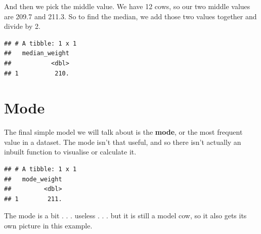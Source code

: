 \documentclass[
]{book}
\newenvironment{Shaded}{\begin{snugshade}}{\end{snugshade}}
\newcommand{\ControlFlowTok}[1]{\textcolor[rgb]{0.13,0.29,0.53}{\textbf{#1}}}
\newcommand{\DataTypeTok}[1]{\textcolor[rgb]{0.13,0.29,0.53}{#1}}
\newcommand{\KeywordTok}[1]{\textcolor[rgb]{0.13,0.29,0.53}{\textbf{#1}}}
\newcommand{\NormalTok}[1]{#1}
\newcommand{\OperatorTok}[1]{\textcolor[rgb]{0.81,0.36,0.00}{\textbf{#1}}}
\newcommand{\StringTok}[1]{\textcolor[rgb]{0.31,0.60,0.02}{#1}}
\begin{document}
And then we pick the middle value. We have 12 cows, so our two middle values are 209.7 and 211.3. So to find the median, we add those two values together and divide by 2.

\begin{Shaded}
\end{Shaded}

\begin{verbatim}
## # A tibble: 1 x 1
##   median_weight
##           <dbl>
## 1          210.
\end{verbatim}

\hypertarget{stats_mode}{%
\section{Mode}\label{stats_mode}}

The final simple model we will talk about is the \textbf{mode}, or the most frequent value in a dataset. The mode isn't that useful, and so there isn't actually an inbuilt function to visualise or calculate it.

\begin{Shaded}
\end{Shaded}

\begin{verbatim}
## # A tibble: 1 x 1
##   mode_weight
##         <dbl>
## 1        211.
\end{verbatim}

The mode is a bit . . . useless . . . but it is still a model cow, so it also gets its own picture in this example.
\end{document}
